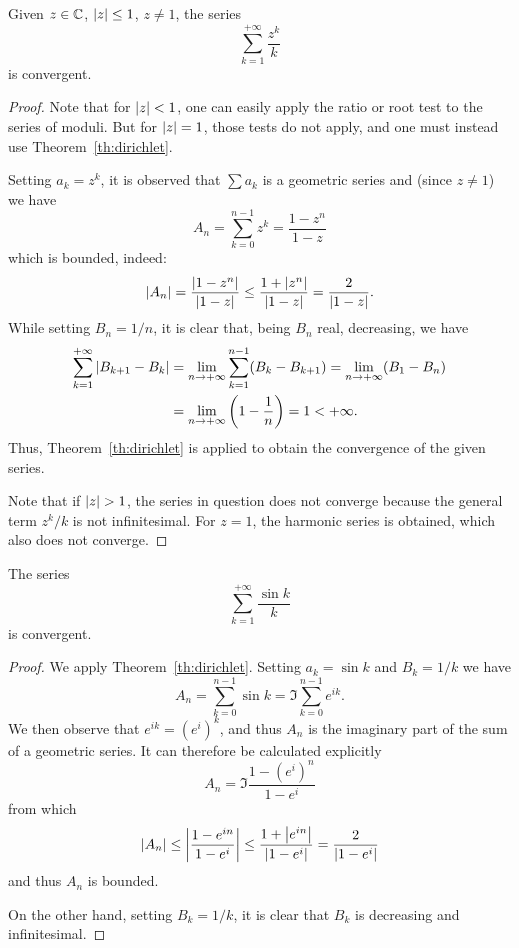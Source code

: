 \begin{example}\label{ex:serie_log}
Given $z\in {\mathbb C}$, ${\left|z\right|} \le 1$, $z\neq 1$, the series
\[
  \sum_{k=1}^{+\infty} \frac{z^k}{k}
\]
is convergent.
\end{example}
\begin{proof}
Note that for ${\left|z\right|}<1$, one can easily apply
the ratio or root test to the series of moduli.
But for ${\left|z\right|}=1$, those tests do not apply, and
one must instead use Theorem~\ref{th:dirichlet}.

Setting $a_k=z^k$, it is observed that $\sum a_k$ is a
geometric series and (since $z\neq 1$) we have
\[
  A_n = \sum_{k=0}^{n-1} z^k = \frac{1-z^n}{1-z}
\]
which is bounded, indeed:
\[
  {\left|A_n\right|} = \frac{{\left|1-z^n\right|}}{{\left|1-z\right|}} \le \frac{1+{\left|z^n\right|}}{{\left|1-z\right|}}
  = \frac{2}{{\left|1-z\right|}}.
\]
While setting $B_n = 1/n$, it is clear that, being $B_n$ real,
decreasing, we have
\begin{align*}
\sum_{k=1}^{+\infty} {\left|B_{k+1}-B_{k}\right|}
&= \lim_{n\to +\infty}\sum_{k=1}^{n-1} (B_k-B_{k+1})
= \lim_{n\to +\infty}(B_1 - B_n)\\
&= \lim_{n\to +\infty}{\left( 1 - \frac{1}{n} \right)} = 1
< +\infty.
\end{align*}
Thus, Theorem~\ref{th:dirichlet} is applied
to obtain the convergence
of the given series.

Note that if ${\left|z\right|}>1$, the series in question does not
converge because the general term $z^k/k$ is not infinitesimal.
For $z=1$, the harmonic series is obtained, which also does not converge.
\end{proof}

\begin{exercise}
  The series
  \[
    \sum_{k=1}^{+\infty} \frac{\sin k}{k}
  \]
  is convergent.
  \end{exercise}
  \begin{proof}
  We apply Theorem~\ref{th:dirichlet}.
  Setting $a_k = \sin k$ and $B_k=1/k$
  we have
  \[
    A_n = \sum_{k=0}^{n-1} \sin k = \Im \sum_{k=0}^{n-1} e^{ik}.
  \]
  We then observe that $e^{ik}=(e^i)^k$, and thus $A_n$ is the imaginary part
  of the sum of a geometric series. 
  It can therefore be calculated explicitly
  \[
    A_n = \Im \frac{1-(e^i)^n}{1-e^i}
  \]
  from which
  \[
    {\left|A_n\right|} \le {\left|\frac{1-e^{in}}{1-e^i}\right|} \le \frac{1+{\left|e^{in}\right|}}{{\left|1-e^i\right|}}
    = \frac{2}{{\left|1-e^i\right|}}
  \]
  and thus $A_n$ is bounded.
  
  On the other hand, setting $B_k = 1/k$, it is clear that $B_k$ is
  decreasing and infinitesimal.
  \end{proof}